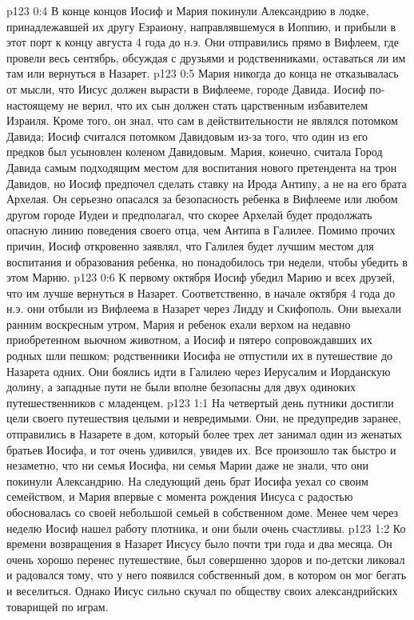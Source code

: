 \vs p123 0:4 \pc В конце концов Иосиф и Мария покинули Александрию в лодке, принадлежавшей их другу Езраиону, направлявшемуся в Иоппию, и прибыли в этот порт к концу августа 4 года до н.э. Они отправились прямо в Вифлеем, где провели весь сентябрь, обсуждая с друзьями и родственниками, оставаться ли им там или вернуться в Назарет.
\vs p123 0:5 Мария никогда до конца не отказывалась от мысли, что Иисус должен вырасти в Вифлееме, городе Давида. Иосиф по\hyp{}настоящему не верил, что их сын должен стать царственным избавителем Израиля. Кроме того, он знал, что сам в действительности не являлся потомком Давида; Иосиф считался потомком Давидовым из\hyp{}за того, что один из его предков был усыновлен коленом Давидовым. Мария, конечно, считала Город Давида самым подходящим местом для воспитания нового претендента на трон Давидов, но Иосиф предпочел сделать ставку на Ирода Антипу, а не на его брата Архелая. Он серьезно опасался за безопасность ребенка в Вифлееме или любом другом городе Иудеи и предполагал, что скорее Архелай будет продолжать опасную линию поведения своего отца, чем Антипа в Галилее. Помимо прочих причин, Иосиф откровенно заявлял, что Галилея будет лучшим местом для воспитания и образования ребенка, но понадобилось три недели, чтобы убедить в этом Марию.
\vs p123 0:6 К первому октября Иосиф убедил Марию и всех друзей, что им лучше вернуться в Назарет. Соответственно, в начале октября 4 года до н.э. они отбыли из Вифлеема в Назарет через Лидду и Скифополь. Они выехали ранним воскресным утром, Мария и ребенок ехали верхом на недавно приобретенном вьючном животном, а Иосиф и пятеро сопровождавших их родных шли пешком; родственники Иосифа не отпустили их в путешествие до Назарета одних. Они боялись идти в Галилею через Иерусалим и Иорданскую долину, а западные пути не были вполне безопасны для двух одиноких путешественников с младенцем.
\vs p123 1:1 На четвертый день путники достигли цели своего путешествия целыми и невредимыми. Они, не предупредив заранее, отправились в Назарете в дом, который более трех лет занимал один из женатых братьев Иосифа, и тот очень удивился, увидев их. Все произошло так быстро и незаметно, что ни семья Иосифа, ни семья Марии даже не знали, что они покинули Александрию. На следующий день брат Иосифа уехал со своим семейством, и Мария впервые с момента рождения Иисуса с радостью обосновалась со своей небольшой семьей в собственном доме. Менее чем через неделю Иосиф нашел работу плотника, и они были очень счастливы.
\vs p123 1:2 Ко времени возвращения в Назарет Иисусу было почти три года и два месяца. Он очень хорошо перенес путешествие, был совершенно здоров и по\hyp{}детски ликовал и радовался тому, что у него появился собственный дом, в котором он мог бегать и веселиться. Однако Иисус сильно скучал по обществу своих александрийских товарищей по играм.
